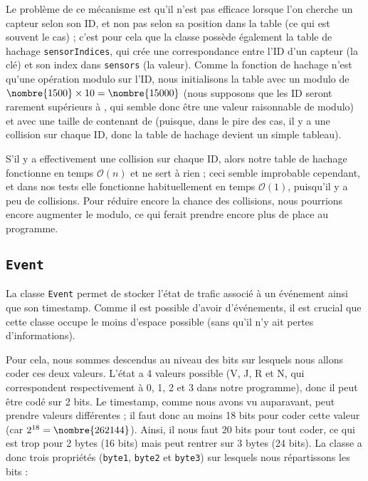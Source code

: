 \documentclass[11pt,a4paper]{article}
\begin{document}
Le problème de ce mécanisme est qu'il n'est pas efficace lorsque l'on cherche un capteur selon son ID, et non pas selon sa position dans la table (ce qui est souvent le cas) ; c'est pour cela que la classe possède également la table de hachage \texttt{sensorIndices}, qui crée une correspondance entre l'ID d'un capteur (la clé) et son index dans \texttt{sensors} (la valeur). Comme la fonction de hachage n'est qu'une opération modulo sur l'ID, nous initialisons la table avec un modulo de $ \nombre{1500} \times{} 10 = \nombre{15000} $ (nous supposons que les ID seront rarement supérieurs à , qui semble donc être une valeur raisonnable de modulo) et avec une taille de contenant de  (puisque, dans le pire des cas, il y a une collision sur chaque ID, donc la table de hachage devient un simple tableau).

S'il y a effectivement une collision sur chaque ID, alors notre table de hachage fonctionne en temps $ \mathcal{O}(n) $ et ne sert à rien ; ceci semble improbable cependant, et dans nos tests elle fonctionne habituellement en temps $ \mathcal{O}(1) $, puisqu'il y a peu de collisions. Pour réduire encore la chance des collisions, nous pourrions encore augmenter le modulo, ce qui ferait prendre encore plus de place au programme.

\subsection{\texttt{Event}}
\label{subsec:Event}

La classe \texttt{Event} permet de stocker l'état de trafic associé à un événement ainsi que son timestamp. Comme il est possible d'avoir  d'événements, il est crucial que cette classe occupe le moins d'espace possible (sans qu'il n'y ait pertes d'informations).

Pour cela, nous sommes descendus au niveau des bits sur lesquels nous allons coder ces deux valeurs. L'état a 4 valeurs possible (V, J, R et N, qui correspondent respectivement à 0, 1, 2 et 3 dans notre programme), donc il peut être codé sur 2 bits. Le timestamp, comme nous avons vu auparavant, peut prendre  valeurs différentes ; il faut donc au moins 18 bits pour coder cette valeur (car $ 2^{18} = \nombre{262144} $). Ainsi, il nous faut 20 bits pour tout coder, ce qui est trop pour 2 bytes (16 bits) mais peut rentrer sur 3 bytes (24 bits). La classe a donc trois propriétés (\texttt{byte1}, \texttt{byte2} et \texttt{byte3}) sur lesquels nous répartissons les bits :
\end{document}
